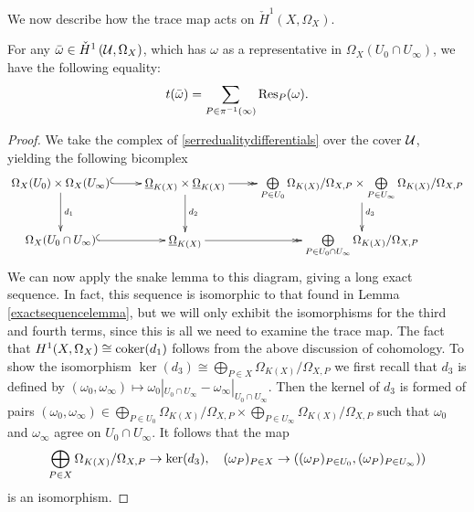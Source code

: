 We now describe how the trace map acts on $\check{H}^1(X,\Omega_X)$.
    \begin{lem}\label{tracemaplemma}
    For any $\bar \omega \in \check{H}^1\left ({\mathcal U}, \Omega_X\right )$, which has $\omega$ as a representative in $\Omega_X(U_0 \cap U_\infty)$, we have the following equality:
        \[
        t(\bar \omega) = \sum_{P \in \pi^{-1}(\infty)}\operatorname{Res}_P(\omega).
        \]
    \end{lem}
    \begin{proof}
    We take the \cech complex of \eqref{serredualitydifferentials} over the cover ${\mathcal U}$, yielding the following bicomplex
        \begin{equation}\label{dualitydiagram2}
        \xymatrix{\Omega_X(U_0)\times\Omega_X(U_\infty) \ar@{^{(}->}[r] \ar[d]^{d_1} & \underline{\Omega}_{K(X)} \times \underline{\Omega}_{K(X)} \ar[d]^{d_2} \ar@{->>}[r] & \bigoplus \limits_{P \in U_0} \Omega_{K(X)}/\Omega_{X,P} \times \bigoplus \limits_{P \in U_\infty} \Omega_{K(X)}/\Omega_{X,P} \ar[d]^{d_3} \\
        \Omega_X(U_0 \cap U_\infty) \ar@{^{(}->}[r]  & \underline{\Omega}_{K(X)} \ar@{->>}[r] & \bigoplus \limits_{P\in U_0 \cap U_\infty} \Omega_{K(X)}/\Omega_{X,P} }
        \end{equation}
    We can now apply the snake lemma to this diagram, giving a long exact sequence.
    In fact, this sequence is isomorphic to that found in Lemma \ref{exactsequencelemma}, but we will only exhibit the isomorphisms for the third and fourth terms, since this is all we need to examine the trace map.
    The fact that $H^1(X,\Omega_X) \cong {\rm coker}(d_1)$ follows from the above discussion of \cech cohomology.
    To show the isomorphism $\ker(d_3) \cong \bigoplus_{P \in X} \Omega_{K(X)}/\Omega_{X,P}$ we first recall that $d_3$ is defined by $(\omega_0, \omega_\infty) \mapsto \omega_0|_{U_0 \cap U_\infty} - \omega_\infty|_{U_0 \cap U_\infty}$.
    Then the kernel of $d_3$ is formed of pairs $(\omega_0, \omega_\infty) \in \bigoplus_{P \in U_0} \Omega_{K(X)}/\Omega_{X,P} \times \bigoplus_{P \in  U_\infty} \Omega_{K(X)}/\Omega_{X,P}$ such that $\omega_0$ and $\omega_\infty$ agree on $U_0 \cap U_\infty$.
    It follows that the map 
        \[
        \bigoplus_{P \in X} \Omega_{K(X)}/\Omega_{X,P}\rightarrow\ker(d_3), \quad  (\omega_P)_{P \in X} \to \left( (\omega_P)_{ P \in U_0}, (\omega_P)_{P \in U_\infty}) \right)
        \]
    is an isomorphism.
    

\end{proof}
